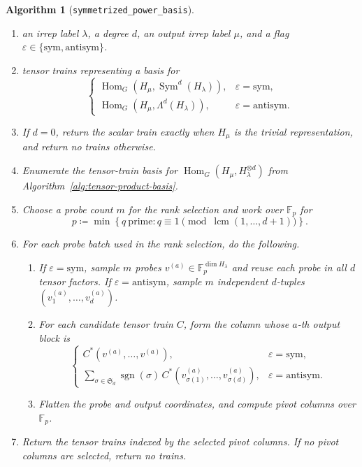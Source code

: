 \documentclass[11pt]{article}
\newcommand{\dsF}{\mathbb{F}}
\newcommand{\HomG}[2]{\operatorname{Hom}_G\!\left(#1,#2\right)}
\newcommand{\Sym}{\operatorname{Sym}}
\newtheorem{algorithm}[theorem]{Algorithm}
\theoremstyle{definition}
\begin{document}
\begin{algorithm}[\texttt{symmetrized\_power\_basis}]\label{alg:symmetrized-power-basis}
  \phantom{}
  \begin{enumerate}[label=\textbf{Step \arabic*.},leftmargin=2.8cm]
    \item[\textbf{Input:}] an irrep label $\lambda$, a degree $d$, an output irrep label $\mu$, and a flag $\varepsilon\in\{\mathrm{sym},\mathrm{antisym}\}$.
    \item[\textbf{Output:}] tensor trains representing a basis for
    \[
      \begin{cases}
        \HomG{H_\mu}{\Sym^d(H_\lambda)}, & \varepsilon=\mathrm{sym},\\
        \HomG{H_\mu}{\Lambda^d(H_\lambda)}, & \varepsilon=\mathrm{antisym}.
      \end{cases}
    \]
    \item If $d=0$, return the scalar train exactly when $H_\mu$ is the trivial representation, and return no trains otherwise.
    \item Enumerate the tensor-train basis for $\HomG{H_\mu}{H_\lambda^{\otimes d}}$ from Algorithm~\ref{alg:tensor-product-basis}.
    \item Choose a probe count $m$ for the rank selection and work over $\dsF_p$ for
    \[
      p\coloneq\min\left\{q\ \text{prime}: q\equiv 1 \pmod{\operatorname{lcm}(1,\dots,d+1)}\right\}.
    \]
    \item For each probe batch used in the rank selection, do the following.
    \begin{enumerate}[label=\textup{(\alph*)},leftmargin=1.4cm]
      \item If $\varepsilon=\mathrm{sym}$, sample $m$ probes $v^{(a)}\in\dsF_p^{\dim H_\lambda}$ and reuse each probe in all $d$ tensor factors. If $\varepsilon=\mathrm{antisym}$, sample $m$ independent $d$-tuples $(v_1^{(a)},\dots,v_d^{(a)})$.
      \item For each candidate tensor train $C$, form the column whose $a$-th output block is
      \[
        \begin{cases}
          C^*(v^{(a)},\dots,v^{(a)}), & \varepsilon=\mathrm{sym},\\
          \displaystyle
          \sum_{\sigma\in\mathfrak S_d}\operatorname{sgn}(\sigma)\,
          C^*(v_{\sigma(1)}^{(a)},\dots,v_{\sigma(d)}^{(a)}),
          & \varepsilon=\mathrm{antisym}.
        \end{cases}
      \]
      \item Flatten the probe and output coordinates, and compute pivot columns over $\dsF_p$.
    \end{enumerate}
    \item Return the tensor trains indexed by the selected pivot columns.  If no pivot columns are selected, return no trains.
  \end{enumerate}
\end{algorithm}
\end{document}

